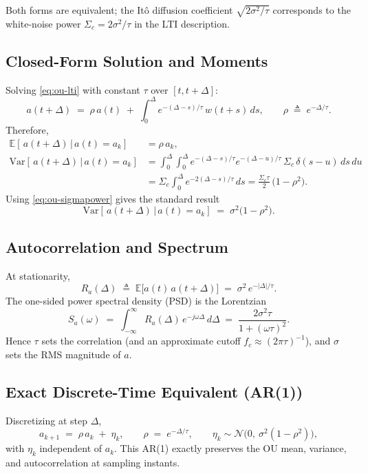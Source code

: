 \documentclass[11pt]{article}
\begin{document}
Both forms are equivalent; the It\^o diffusion coefficient $\sqrt{2\sigma^2/\tau}$ corresponds to
the white-noise power $\Sigma_c = 2\sigma^2/\tau$ in the LTI description.

\subsection{Closed-Form Solution and Moments}
Solving \eqref{eq:ou-lti} with constant $\tau$ over $[t,t+\Delta]$:
\begin{equation}
a(t+\Delta) \;=\; \rho\,a(t) \;+\; \int_0^\Delta e^{-(\Delta-s)/\tau}\,w(t+s)\,ds,
\qquad
\rho \;\triangleq\; e^{-\Delta/\tau}.
\label{eq:ou-sol}
\end{equation}
Therefore,
\begin{align}
\mathbb{E}[\,a(t+\Delta)\,|\,a(t)=a_k] &= \rho\,a_k, \label{eq:ou-mean}\\
\mathrm{Var}[\,a(t+\Delta)\,|\,a(t)=a_k] 
&= \int_0^\Delta\!\!\int_0^\Delta e^{-(\Delta-s)/\tau}e^{-(\Delta-u)/\tau}\,\Sigma_c\,\delta(s-u)\,ds\,du
\nonumber\\
&= \Sigma_c \int_0^\Delta e^{-2(\Delta-s)/\tau}\,ds
= \frac{\Sigma_c\tau}{2}\,\big(1-\rho^2\big).
\end{align}
Using \eqref{eq:ou-sigmapower} gives the standard result
\begin{equation}
\mathrm{Var}[\,a(t+\Delta)\,|\,a(t)=a_k] \;=\; \sigma^2\big(1-\rho^2\big).
\label{eq:ou-var-step}
\end{equation}

\subsection{Autocorrelation and Spectrum}
At stationarity,
\begin{equation}
R_a(\Delta) \;\triangleq\; \mathbb{E}\big[a(t)\,a(t+\Delta)\big] \;=\; \sigma^2\,e^{-|\Delta|/\tau}.
\label{eq:ou-autocorr}
\end{equation}
The one-sided power spectral density (PSD) is the Lorentzian
\begin{equation}
S_a(\omega) \;=\; \int_{-\infty}^{\infty} R_a(\Delta)\,e^{-j\omega \Delta}\,d\Delta
\;=\; \frac{2\sigma^2\tau}{1+(\omega\tau)^2}.
\label{eq:ou-psd}
\end{equation}
Hence $\tau$ sets the correlation (and an approximate cutoff $f_c \approx (2\pi\tau)^{-1}$),
and $\sigma$ sets the RMS magnitude of $a$.

\subsection{Exact Discrete-Time Equivalent (AR(1))}
Discretizing at step $\Delta$,
\begin{equation}
a_{k+1} \;=\; \rho\,a_k \;+\; \eta_k,
\qquad
\rho \;=\; e^{-\Delta/\tau}, 
\qquad
\eta_k \sim \mathcal{N}\!\big(0,\ \sigma^2(1-\rho^2)\big),
\label{eq:ou-ar1}
\end{equation}
with $\eta_k$ independent of $a_k$. This AR(1) exactly preserves the OU mean, variance,
and autocorrelation at sampling instants.
\end{document}
